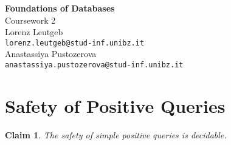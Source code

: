 \documentclass[a4paper,12pt]{article}
\newtheorem{claim}{Claim}
\begin{document}
\begin{center}
{\LARGE\bfseries Foundations of Databases}\\[3mm]

{\Large Coursework 2}\\[5mm]

Lorenz Leutgeb\\\texttt{lorenz.leutgeb@stud-inf.unibz.it}\\[2mm]
Anastassiya Pustozerova\\\texttt{anastassiya.pustozerova@stud-inf.unibz.it}
\end{center}

\section{Safety of Positive Queries}

\begin{claim}
The safety of simple positive queries is decidable.
\end{claim}
\end{document}
